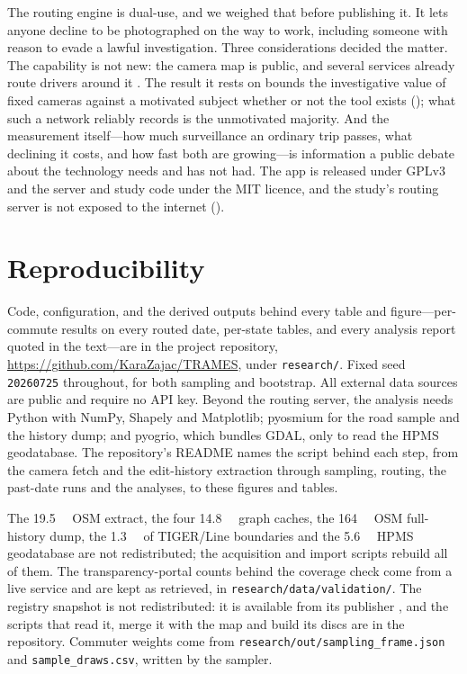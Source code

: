 \documentclass[11pt,twoside]{article}
\begin{document}
The routing engine is dual-use, and we weighed that before publishing it. It lets anyone decline
to be photographed on the way to work, including someone with reason to evade a lawful
investigation. Three considerations decided the matter. The capability is not new: the camera
map is public, and several services already route drivers around it
\citep{deflockmaps,flockhopper,banditkin}. The result it rests on bounds the investigative
value of fixed cameras against a motivated subject whether or not the tool exists
(); what such a network reliably records is the unmotivated majority. And
the measurement itself---how much surveillance an ordinary trip passes, what declining it costs,
and how fast both are growing---is information a public debate about the technology needs and
has not had. The app is released under GPLv3 and the server and study code under the MIT
licence, and the study's routing server is not exposed to the internet ().

\section{Reproducibility}

Code, configuration, and the derived outputs behind every table and figure---per-commute
results on every routed date, per-state tables, and every analysis report quoted in the
text---are in the project repository, \url{https://github.com/KaraZajac/TRAMES}, under
\texttt{research/}. Fixed seed \texttt{20260725} throughout, for both sampling and bootstrap.
All external data sources are public and require no API key. Beyond the routing server, the
analysis needs Python with NumPy, Shapely and Matplotlib; pyosmium for the road sample and the
history dump; and pyogrio, which bundles GDAL, only to read the HPMS geodatabase. The
repository's README names the script behind each step, from the camera fetch and the
edit-history extraction through sampling, routing, the past-date runs and the analyses, to
these figures and tables.

\noindent
The \SI{19.5}{\giga\byte} OSM extract, the four \SI{14.8}{\giga\byte} graph caches, the
\SI{164}{\giga\byte} OSM full-history dump, the \SI{1.3}{\giga\byte} of TIGER/Line boundaries and
the \SI{5.6}{\giga\byte} HPMS geodatabase are not redistributed; the acquisition and import scripts rebuild all of them. The
transparency-portal counts behind the coverage check come from a live service and are kept as
retrieved, in \texttt{research/data/validation/}. The registry snapshot is not redistributed:
it is available from its publisher \citep{michael2026}, and the scripts that read it, merge
it with the map and build its discs are in the repository. Commuter weights come from
\texttt{research/out/sampling\_frame.json} and \texttt{sample\_draws.csv}, written by the
sampler.
\end{document}
